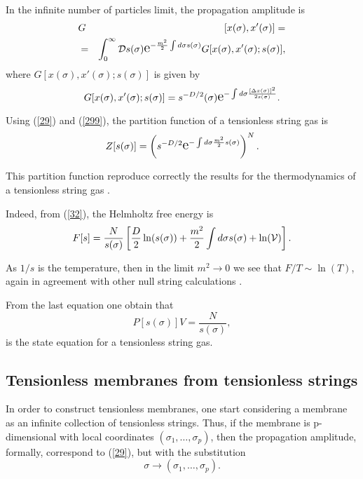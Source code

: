 \documentclass[a4paper,aps,twocolumn,amsfonts]{revtex4}
\begin{document}
   In the infinite number of particles limit, the propagation amplitude is
   \begin{eqnarray}
   &G&[x(\sigma),x'(\sigma)]=\nonumber
   \\
   &=& \int_0^{\infty} {\cal D} s(\sigma)\text{\Large e}^{-\frac{m^2}{2}\int  d\sigma
   s(\sigma)}G[x(\sigma),x'(\sigma);s(\sigma)],  \label{29}
   \end{eqnarray}
   where $G[x(\sigma),x'(\sigma);s(\sigma)]$ is given by
   \begin{equation}
   G[x(\sigma),x'(\sigma);s(\sigma)]=s^{-D/2}(\sigma) \text{\Large e}^{-\int
   d\sigma \frac{[\Delta x(\sigma)]^2}{2s(\sigma)}}. \label{299}
   \end{equation}

   Using (\ref{29}) and (\ref{299}), the partition function of a tensionless string gas is
   \begin{equation}
   Z[s(\sigma)]=\left(s^{-D/2}\text{\Large e}^{-\int d\sigma
   \frac{m^2}{2}s(\sigma)}\right)^N.
   \label{32}
   \end{equation}

   This partition function reproduce correctly the results for the thermodynamics  of a tensionless string gas \cite{string}.

   Indeed, from (\ref{32}), the Helmholtz free energy is
   \[
   F[s]=\frac{N}{s(\sigma)}\left[ \frac{D}{2} \ln(s(\sigma)) +\frac{m^2}{2}\int
   d\sigma s(\sigma) +\ln({\cal V})
   \right].
   \]

   As  $1/s$ is the temperature, then in the limit $m^2\rightarrow 0 $ we see that $F/T \sim \ln(T)$, again in agreement with other null string calculations \cite{string,atick}.

   From the last equation one obtain that
   \begin{equation}
   P[s(\sigma)]{ V}=\frac{N}{s(\sigma)},
   \end{equation}
   is the state equation for a tensionless string gas.

   \subsection{Tensionless membranes from tensionless strings}

  In order to construct tensionless membranes, one start considering a membrane as an infinite collection of tensionless strings. Thus, if the membrane is p-dimensional with local coordinates $(\sigma_1,\dots,\sigma_p)$, then the propagation amplitude, formally, correspond to  (\ref{29}), but with the substitution
   \[
   \sigma\rightarrow (\sigma_1,\dots,\sigma_p).
   \]
\end{document}
